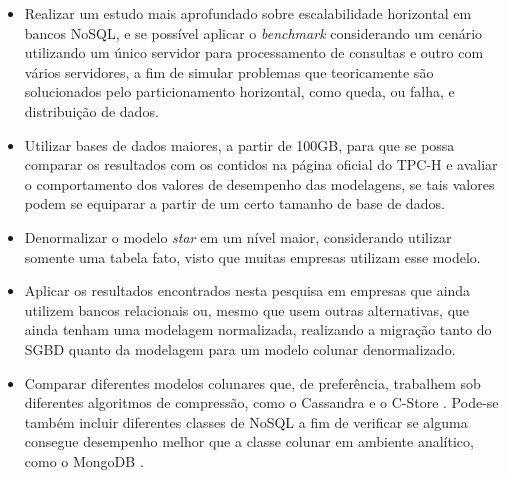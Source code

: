 \begin{itemize}
    \item Realizar um estudo mais aprofundado sobre escalabilidade horizontal em bancos NoSQL, e se possível aplicar o \textit{benchmark} considerando um cenário utilizando um único servidor para processamento de consultas e outro com vários servidores, a fim de simular problemas que teoricamente são solucionados pelo particionamento horizontal, como queda, ou falha, e distribuição de dados.

    \item Utilizar bases de dados maiores, a partir de 100GB, para que se possa comparar os resultados com os contidos na página oficial do TPC-H e avaliar o comportamento dos valores de desempenho das modelagens, se tais valores podem se equiparar a partir de um certo tamanho de base de dados.

    \item Denormalizar o modelo \textit{star} em um nível maior, considerando utilizar somente uma tabela fato, visto que muitas empresas utilizam esse modelo.

    \item Aplicar os resultados encontrados nesta pesquisa em empresas que ainda utilizem bancos relacionais ou, mesmo que usem outras alternativas, que ainda tenham uma modelagem normalizada, realizando a migração tanto do SGBD quanto da modelagem para um modelo colunar denormalizado.

    \item Comparar diferentes modelos colunares que, de preferência, trabalhem sob diferentes algoritmos de compressão, como o Cassandra \cite{cassandra2018nosql} e o C-Store \cite{cstore2018nosql}. Pode-se também incluir diferentes classes de NoSQL a fim de verificar se alguma consegue desempenho melhor que a classe colunar em ambiente analítico, como o MongoDB \cite{mongo2018nosql}.

\end{itemize}
